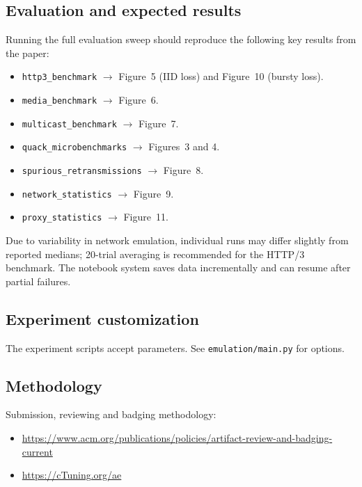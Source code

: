 \documentclass[sigplan,review]{acmart}
\begin{document}
\subsection{Evaluation and expected results}

Running the full evaluation sweep should reproduce the following key
results from the paper:

\begin{itemize}
  \item \texttt{http3\_benchmark} $\rightarrow$ Figure~5 (IID loss) and Figure~10 (bursty loss).
  \item \texttt{media\_benchmark} $\rightarrow$ Figure~6.
  \item \texttt{multicast\_benchmark} $\rightarrow$ Figure~7.
  \item \texttt{quack\_microbenchmarks} $\rightarrow$ Figures~3 and 4.
  \item \texttt{spurious\_retransmissions} $\rightarrow$ Figure~8.
  \item \texttt{network\_statistics} $\rightarrow$ Figure~9.
  \item \texttt{proxy\_statistics} $\rightarrow$ Figure~11.
\end{itemize}

Due to variability in network emulation, individual runs may differ
slightly from reported medians; 20-trial averaging is recommended for
the HTTP/3 benchmark. The notebook system saves data incrementally and
can resume after partial failures.

\subsection{Experiment customization}

The experiment scripts accept parameters. See \texttt{emulation/main.py} for options.

\subsection{Methodology}

Submission, reviewing and badging methodology:

\begin{itemize}
  \item \url{https://www.acm.org/publications/policies/artifact-review-and-badging-current}
  \item \url{https://cTuning.org/ae}
\end{itemize}

\end{document}
